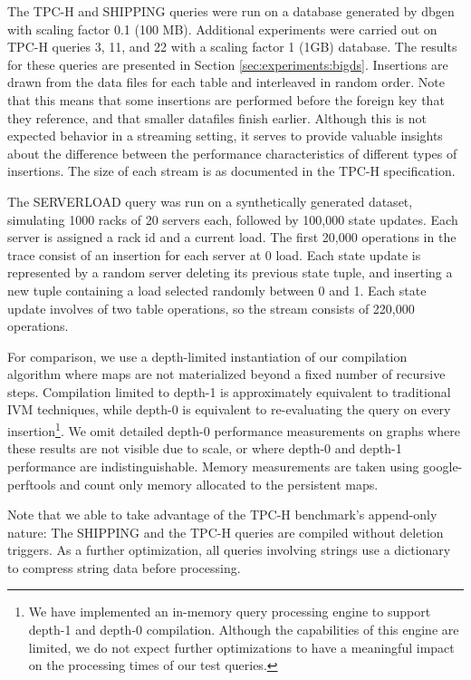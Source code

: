 The TPC-H and SHIPPING queries were run on a database generated by dbgen\cite{tpch} with scaling factor 0.1 (100 MB).  Additional experiments were carried out on TPC-H queries 3, 11, and 22 with a scaling factor 1 (1GB) database.  The results for these queries are presented in Section \ref{sec:experiments:bigds}.  Insertions are drawn from the data files for each table and interleaved in random order.  Note that this means that some insertions are performed before the foreign key that they reference, and that smaller datafiles finish earlier.  Although this is not expected behavior in a streaming setting, it serves to provide valuable insights about the difference between the performance characteristics of different types of insertions.  The size of each stream is as documented in the TPC-H specification\cite{tpch}.

The SERVERLOAD query was run on a synthetically generated dataset, simulating 1000 racks of 20 servers each, followed by 100,000 state updates.  Each server is assigned a rack id and a current load.  The first 20,000 operations in the trace consist of an insertion for each server at 0 load.  Each state update is represented by a random server deleting its previous state tuple, and inserting a new tuple containing a load selected randomly between 0 and 1.  Each state update involves of two table operations, so the stream consists of 220,000 operations.

For comparison, we use a depth-limited instantiation of our compilation algorithm where maps are not materialized beyond a fixed number of recursive steps.  Compilation limited to depth-1 is approximately equivalent to traditional IVM techniques, while depth-0 is equivalent to re-evaluating the query on every insertion\footnote{We have implemented an in-memory query processing engine to support depth-1 and depth-0 compilation.  Although the capabilities of this engine are limited, we do not expect further optimizations  to have a meaningful impact on the processing times of our test queries.}.  We omit detailed depth-0 performance measurements on graphs where these results are not visible due to scale, or where depth-0 and depth-1 performance are indistinguishable.  Memory measurements are taken using google-perftools\cite{perftools} and count only memory allocated to the persistent maps.

Note that we able to take advantage of the TPC-H benchmark's append-only nature: The SHIPPING and the TPC-H queries are compiled without deletion triggers.  As a further optimization, all queries involving strings use a dictionary to compress string data before processing.

